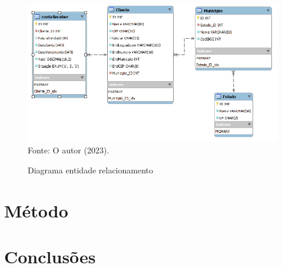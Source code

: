 \begin{figure}[h!]
  \caption{Diagrama entidade relacionamento}
  \includegraphics[width=\textwidth]{figure/diagram_EER.png}
  \label{fig:DER}
  {\fontsize{10pt}{\baselineskip}\selectfont
  Fonte: O autor (2023).}
\end{figure}

\newpage

\section{Método}





\section{Conclusões}


